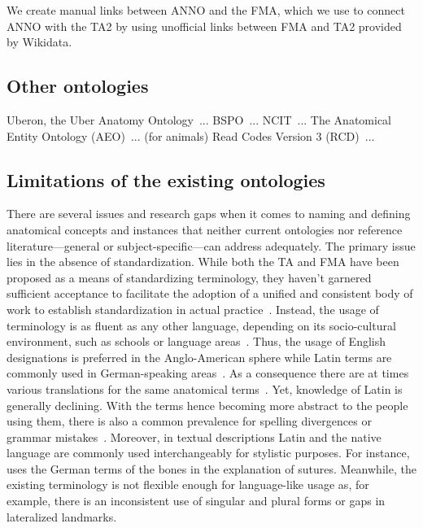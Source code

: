 \documentclass[sw]{iosart2x}
\begin{document}
We create manual links between ANNO and the FMA, which we use to connect ANNO with the TA2 by using unofficial links between FMA and TA2 provided by Wikidata.

\subsection{Other ontologies}\label{sec:researchgaps}

Uberon, the Uber Anatomy Ontology~\citep{uberon}...
BSPO~\citep{bspo}...
NCIT~\citep{ncit}...
The Anatomical Entity Ontology (AEO)~\citep{aeo}... (for animals)
Read Codes Version 3 (RCD)~\citep{rcd}...

\subsection{Limitations of the existing ontologies}\label{sec:limitations}

There are several issues and research gaps when it comes to naming and defining anatomical concepts and instances that neither current ontologies nor reference literature---general or subject-specific---can address adequately.
%
The primary issue lies in the absence of standardization.
While both the TA and FMA have been proposed as a means of standardizing terminology, they haven't garnered sufficient acceptance to facilitate the adoption of a unified and consistent body of work to establish standardization in actual practice~\citep{frequencyta,doestamatter,athighlights}.
Instead, the usage of terminology is as fluent as any other language, depending on its socio-cultural environment, such as schools or language areas~\citep{doestamatter,atthennow,atinfo,frequencyta,atcompare}.
Thus, the usage of English designations is preferred in the Anglo-American sphere while Latin terms are commonly used in German-speaking areas~\citep{anatomycontribution,anatomylexicon,reforminganatomical}.
As a consequence there are at times various translations for the same anatomical terms~\citep{naminggame}.
Yet, knowledge of Latin is generally declining.
With the terms hence becoming more abstract to the people using them, there is also a common prevalence for spelling divergences or grammar mistakes~\citep{ta17,anatomylexicon,athighlights,diphthongs}.
Moreover, in textual descriptions Latin and the native language are commonly used interchangeably for stylistic purposes.
For instance, \cite{anatomylexicon} uses the German terms of the bones in the explanation of sutures.
Meanwhile, the existing terminology is not flexible enough for language-like usage as, for example, there is an inconsistent use of singular and plural forms or gaps in lateralized landmarks.
\end{document}
